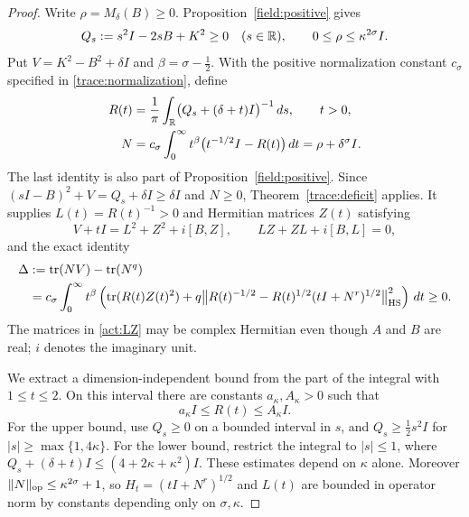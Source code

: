 \begin{proof}
Write $\rho=M_\delta(B)\geq0$.  Proposition~\ref{field:positive}
gives
\begin{equation}\label{act:positive-symbol}
 Q_s:=s^2I-2sB+K^2\geq0\quad(s\in\mathbb R),
 \qquad 0\leq\rho\leq\kappa^{2\sigma}I.
\end{equation}
Put $V=K^2-B^2+\delta I$ and $\beta=\sigma-\tfrac12$.
With the positive normalization constant $c_\sigma$ specified in
\eqref{trace:normalization}, define
\begin{equation}\label{act:RN}
 \begin{split}
 R(t)&=\frac1\pi\int_\mathbb R
           \bigl(Q_s+(\delta+t)I\bigr)^{-1}\,ds,\qquad t>0,\\
 N&=c_\sigma\int_0^\infty
           t^\beta\bigl(t^{-1/2}I-R(t)\bigr)\,dt
       =\rho+\delta^\sigma I.
 \end{split}
\end{equation}
The last identity is also part of Proposition~\ref{field:positive}.
Since $(sI-B)^2+V=Q_s+\delta I\geq\delta I$ and $N\geq0$,
Theorem~\ref{trace:deficit} applies.  It supplies
$L(t)=R(t)^{-1}>0$ and Hermitian matrices $Z(t)$ satisfying
\begin{equation}\label{act:LZ}
 V+tI=L^2+Z^2+i[B,Z],\qquad
 LZ+ZL+i[B,L]=0,
\end{equation}
and the exact identity
\begin{align}
 \Delta&:=\operatorname{tr}(NV)-\operatorname{tr}(N^q)\notag\\
 &=c_\sigma\int_0^\infty t^\beta
    \left(\operatorname{tr}(R(t)Z(t)^2)
      +q\bigl\|R(t)^{-1/2}
           -R(t)^{1/2}(tI+N^r)^{1/2}\bigr\|_{\mathrm{HS}}^2\right)\,dt
       \geq0.
       \label{act:trace-deficit}
\end{align}
The matrices in \eqref{act:LZ} may be complex Hermitian even though
$A$ and $B$ are real; $i$ denotes the imaginary unit.

We extract a dimension-independent bound from the part of the
integral with $1\leq t\leq2$.  On this interval there are constants
$a_\kappa,A_\kappa>0$ such that
\begin{equation}\label{act:R-bounds}
                       a_\kappa I\leq R(t)\leq A_\kappa I.
\end{equation}
For the upper bound, use $Q_s\geq0$ on a bounded interval in $s$,
and $Q_s\geq\tfrac12s^2I$ for $|s|\geq\max\{1,4\kappa\}$.
For the lower bound, restrict the integral to $|s|\leq1$, where
$Q_s+(\delta+t)I\leq(4+2\kappa+\kappa^2)I$.
These estimates depend on $\kappa$ alone.  Moreover
$\|N\|_{\operatorname{op}}\leq\kappa^{2\sigma}+1$, so
$H_t=(tI+N^r)^{1/2}$ and $L(t)$ are bounded in operator norm by
constants depending only on $\sigma,\kappa$.


\end{proof}
